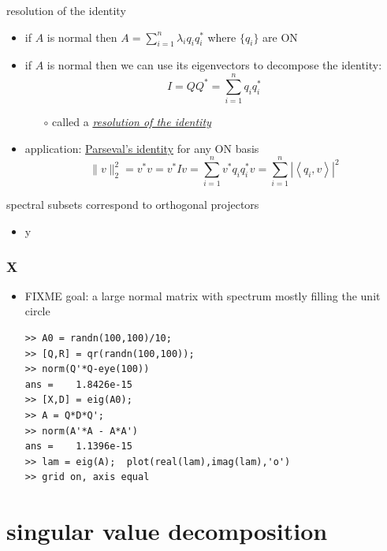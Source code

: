 \documentclass[10pt,hyperref]{beamer}
\newcommand{\ds}{\displaystyle}
\newcommand{\ip}[2]{\left<#1,#2\right>}
\begin{document}
\begin{frame}{resolution of the identity}

\begin{itemize}
\item if $A$ is normal then $\ds A = \sum_{i=1}^n \lambda_i q_i q_i^*$ where $\{q_i\}$ are ON
\item if $A$ is normal then we can use its eigenvectors to decompose the identity:
    $$I = Q Q^* = \sum_{i=1}^n q_i q_i^*$$

    \vspace{-2mm}
    \begin{itemize}
    \item[$\circ$] called a \href{https://en.wikipedia.org/wiki/Spectral_theory\#Resolution_of_the_identity}{\emph{resolution of the identity}}
    \end{itemize}
\item application: \href{https://en.wikipedia.org/wiki/Parseval's_identity}{Parseval's identity} for any ON basis
    $$\|v\|_2^2 = v^* v = v^* I v = \sum_{i=1}^n v^* q_i q_i^* v = \sum_{i=1}^n |\ip{q_i}{v}|^2$$
\end{itemize}
\end{frame}


\begin{frame}{spectral subsets correspond to orthogonal projectors}

\begin{itemize}
\item y
\end{itemize}
\end{frame}


\begin{frame}[fragile]
\frametitle{X}

\begin{itemize}
\item FIXME  goal: a large normal matrix with spectrum mostly filling the unit circle

\begin{Verbatim}[fontsize=\scriptsize]
>> A0 = randn(100,100)/10;
>> [Q,R] = qr(randn(100,100));
>> norm(Q'*Q-eye(100))
ans =    1.8426e-15
>> [X,D] = eig(A0);
>> A = Q*D*Q';
>> norm(A'*A - A*A')
ans =    1.1396e-15
>> lam = eig(A);  plot(real(lam),imag(lam),'o')
>> grid on, axis equal
\end{Verbatim}

\end{itemize}
\end{frame}


\section{singular value decomposition}
\end{document}

